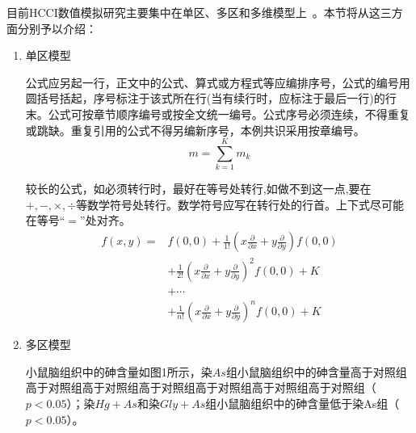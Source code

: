 目前HCCI数值模拟研究主要集中在单区、多区和多维模型上~\cite{jiang1998woods}。本节将从这三方面分别予以介绍：
\begin{enumerate}
\item 单区模型

    公式应另起一行，正文中的公式、算式或方程式等应编排序号，公式的编号用圆括号括起，序号标注于该式所在行(当有续行时，应标注于最后一行)的行末。公式可按章节顺序编号或按全文统一编号。公式序号必须连续，不得重复或跳缺。重复引用的公式不得另编新序号，本例共识采用按章编号。
    \begin{equation} \label{eqn:signle-line-eq}
        m = \sum_{k=1}^{K} m_k
    \end{equation}

    较长的公式，如必须转行时，最好在等号处转行,如做不到这一点,要在$+,-,×,÷$等数学符号处转行。数学符号应写在转行处的行首。上下式尽可能在等号“$=$”处对齐。
    \begin{equation} \label{eqn:multi-line-eq}
    \begin{split}
        f(x,y) = & f(0,0) + \frac{1}{1!} (x\frac{\partial}{\partial x} + y\frac{\partial}{\partial y}) f(0,0) \\ 
        &+  \frac{1}{2!} (x\frac{\partial}{\partial x} + y\frac{\partial}{\partial y})^2 f(0,0) + K \\
        &+ \cdots \\
        &+  \frac{1}{n!} (x\frac{\partial}{\partial x} + y\frac{\partial}{\partial y})^n f(0,0) + K 
    \end{split}
    \end{equation}
\item 多区模型

    小鼠脑组织中的砷含量如图1所示，染$As$组小鼠脑组织中的砷含量高于对照组高于对照组高于对照组高于对照组高于对照组高于对照组高于对照组（$p<0.05$）；染$Hg+As$和染$Gly+As$组小鼠脑组织中的砷含量低于染As组（$p<0.05$）。
\end{enumerate}